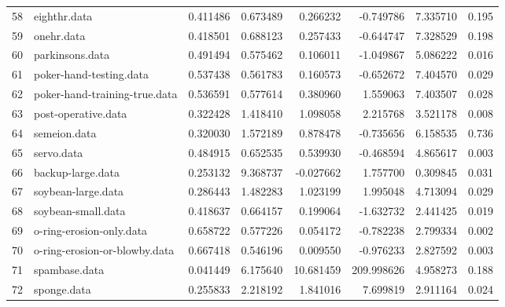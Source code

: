 \begin{table}
{\begin{tabular}{llrrrrrr}
58 &                             eighthr.data &       0.411486 &               0.673489 &   0.266232 &   -0.749786 &  7.335710 &        0.195 \\
59 &                               onehr.data &       0.418501 &               0.688123 &   0.257433 &   -0.644747 &  7.328529 &        0.198 \\
60 &                          parkinsons.data &       0.491494 &               0.575462 &   0.106011 &   -1.049867 &  5.086222 &        0.016 \\
61 &                  poker-hand-testing.data &       0.537438 &               0.561783 &   0.160573 &   -0.652672 &  7.404570 &        0.029 \\
62 &            poker-hand-training-true.data &       0.536591 &               0.577614 &   0.380960 &    1.559063 &  7.403507 &        0.028 \\
63 &                      post-operative.data &       0.322428 &               1.418410 &   1.098058 &    2.215768 &  3.521178 &        0.008 \\
64 &                             semeion.data &       0.320030 &               1.572189 &   0.878478 &   -0.735656 &  6.158535 &        0.736 \\
65 &                               servo.data &       0.484915 &               0.652535 &   0.539930 &   -0.468594 &  4.865617 &        0.003 \\
66 &                        backup-large.data &       0.253132 &               9.368737 &  -0.027662 &    1.757700 &  0.309845 &        0.031 \\
67 &                       soybean-large.data &       0.286443 &               1.482283 &   1.023199 &    1.995048 &  4.713094 &        0.029 \\
68 &                       soybean-small.data &       0.418637 &               0.664157 &   0.199064 &   -1.632732 &  2.441425 &        0.019 \\
69 &                 o-ring-erosion-only.data &       0.658722 &               0.577226 &   0.054172 &   -0.782238 &  2.799334 &        0.002 \\
70 &            o-ring-erosion-or-blowby.data &       0.667418 &               0.546196 &   0.009550 &   -0.976233 &  2.827592 &        0.003 \\
71 &                            spambase.data &       0.041449 &               6.175640 &  10.681459 &  209.998626 &  4.958273 &        0.188 \\
72 &                              sponge.data &       0.255833 &               2.218192 &   1.841016 &    7.699819 &  2.911164 &        0.024 \\

\end{tabular}}
\end{table}
